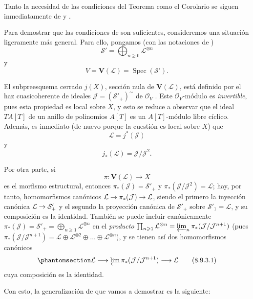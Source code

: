 \documentclass[oneside,10pt]{amsart}
\makeatletter
\newcommand{\ega@arrow}[2]{\mathchoice{#1}{#2}{#2}{#2}}
\renewcommand{\to}{\ega@arrow{\longrightarrow}{\rightarrow}}
\let\EGAOriginalLabel\label
\renewcommand{\label}[1]{\phantomsection\EGAOriginalLabel{#1}}
\makeatother
\begin{document}
\begin{env}[8.9.3]
\label{II.8.9.3-fr}
Tanto la necesidad de las condiciones del Teorema  como el Corolario  se siguen inmediatamente de  y .

Para demostrar que las condiciones de  son suficientes, consideremos una situación ligeramente más general.
Para ello, pongamos (con las notaciones de )
\[
  \mathcal{S}'=\bigoplus_{n\geqslant 0}\mathcal{L}^{\otimes n}
\]
y
\[
  V=\mathbf{V}(\mathcal{L})=\operatorname{Spec}(\mathcal{S}').
\]

El subpreesquema cerrado $j(X)$, sección nula de $\mathbf{V}(\mathcal{L})$, está definido por el haz cuasicoherente de ideales $\mathcal{J}=(\mathcal{S}'_+)^{\sim}$ de $\mathcal{O}_V$ .
Este $\mathcal{O}_V$-módulo es \emph{invertible}, pues esta propiedad es local sobre $X$, y esto se reduce a observar que el ideal $TA[T]$ de un anillo de polinomios $A[T]$ es un $A[T]$-módulo libre cíclico.
Además, es inmediato (de nuevo porque la cuestión es local sobre $X$) que
\[
  \mathcal{L}=j^*(\mathcal{J})
\]
y
\[
  j_*(\mathcal{L})=\mathcal{J}/\mathcal{J}^2.
\]

Por otra parte, si
\[
  \pi:\mathbf{V}(\mathcal{L})\longrightarrow X
\]
es el morfismo estructural, entonces $\pi_*(\mathcal{J})=\mathcal{S}'_+$ y $\pi_*(\mathcal{J}/\mathcal{J}^2)=\mathcal{L}$;
hay, por tanto, homomorfismos canónicos $\mathcal{L}\to\pi_*(\mathcal{J})\to\mathcal{L}$, siendo el primero la inyección canónica $\mathcal{L}\to\mathcal{S}'_+$ y el segundo la proyección canónica de $\mathcal{S}'_+$ sobre $\mathcal{S}'_1=\mathcal{L}$, y su composición es la identidad.
También se puede incluir canónicamente $\pi_*(\mathcal{J})=\mathcal{S}'_+=\bigoplus_{n\geqslant 1}\mathcal{L}^{\otimes n}$ en el \emph{producto} $\prod_{n\geqslant 1}\mathcal{L}^{\otimes n}=\varprojlim_n\pi_*(\mathcal{J}/\mathcal{J}^{n+1})$ (pues $\pi_*(\mathcal{J}/\mathcal{J}^{n+1})=
\mathcal{L}\oplus\mathcal{L}^{\otimes2}\oplus\ldots\oplus
\mathcal{L}^{\otimes n}$), y se tienen así dos homomorfismos canónicos
\begin{equation}
\label{II.8.9.3.1-fr}
  \mathcal{L}\longrightarrow
  \varprojlim\pi_*(\mathcal{J}/\mathcal{J}^{n+1})
  \longrightarrow\mathcal{L}
\tag{8.9.3.1}
\end{equation}
cuya composición es la identidad.

Con esto, la generalización de  que vamos a demostrar es la siguiente:
\end{env}
\end{document}
